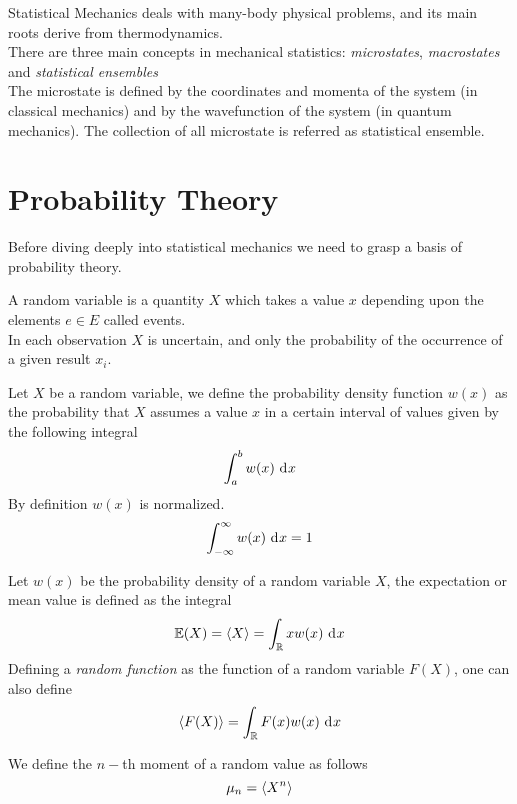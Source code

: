 \documentclass[../qm.tex]{subfiles}
\begin{document}
	Statistical Mechanics deals with many-body physical problems, and its main roots derive from thermodynamics.\\
	There are three main concepts in mechanical statistics: \textit{microstates}, \textit{macrostates} and \textit{statistical ensembles}\\
	The microstate is defined by the coordinates and momenta of the system (in classical mechanics) and by the wavefunction of the system (in quantum mechanics). The collection of all microstate is referred as statistical ensemble.
	\section{Probability Theory}
	Before diving deeply into statistical mechanics we need to grasp a basis of probability theory.
	\begin{defn}
		A random variable is a quantity $X$ which takes a value $x$ depending upon the elements $e\in E$ called events.\\
		In each observation $X$ is uncertain, and only the probability of the occurrence of a given result $x_i$.
	\end{defn}
	\begin{defn}
		Let $X$ be a random variable, we define the probability density function $w(x)$ as the probability that $X$ assumes a value $x$ in a certain interval of values given by the following integral
		\begin{equation*}
			\int_{a}^{b}w(x)\ \mathrm{d}^{}x
		\end{equation*}
		By definition $w(x)$ is normalized.
		\begin{equation*}
			\int_{-\infty}^{\infty}w(x)\ \mathrm{d}^{}x=1
		\end{equation*}
	\end{defn}
	\begin{defn}
		Let $w(x)$ be the probability density of a random variable $X$, the expectation or mean value is defined as the integral
		\begin{equation*}
			\mathbb{E}(X)=\expval{X}=\int_{\mathbb{R}}xw(x)\ \mathrm{d}^{}x
		\end{equation*}
		Defining a \textit{random function} as the function of a random variable $F(X)$, one can also define
		\begin{equation*}
			\expval{F(X)}=\int_{\mathbb{R}}F(x)w(x)\ \mathrm{d}^{}x
		\end{equation*}
	\end{defn}
	\begin{defn}[Moment]
		We define the $n-$th moment of a random value as follows
		\begin{equation*}
			\mu_n=\expval{X^n}
		\end{equation*}
	\end{defn}
\end{document}
